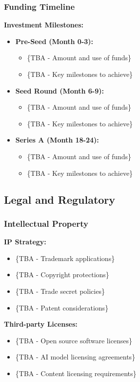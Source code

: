 \subsubsection{Funding Timeline}
\textbf{Investment Milestones:}
\begin{itemize}
    \item \textbf{Pre-Seed (Month 0-3):}
    \begin{itemize}
        \item \{TBA - Amount and use of funds\}
        \item \{TBA - Key milestones to achieve\}
    \end{itemize}
    \item \textbf{Seed Round (Month 6-9):}
    \begin{itemize}
        \item \{TBA - Amount and use of funds\}
        \item \{TBA - Key milestones to achieve\}
    \end{itemize}
    \item \textbf{Series A (Month 18-24):}
    \begin{itemize}
        \item \{TBA - Amount and use of funds\}
        \item \{TBA - Key milestones to achieve\}
    \end{itemize}
\end{itemize}

\subsection{Legal and Regulatory}
\subsubsection{Intellectual Property}
\textbf{IP Strategy:}
\begin{itemize}
    \item \{TBA - Trademark applications\}
    \item \{TBA - Copyright protections\}
    \item \{TBA - Trade secret policies\}
    \item \{TBA - Patent considerations\}
\end{itemize}

\textbf{Third-party Licenses:}
\begin{itemize}
    \item \{TBA - Open source software licenses\}
    \item \{TBA - AI model licensing agreements\}
    \item \{TBA - Content licensing requirements\}
\end{itemize}

